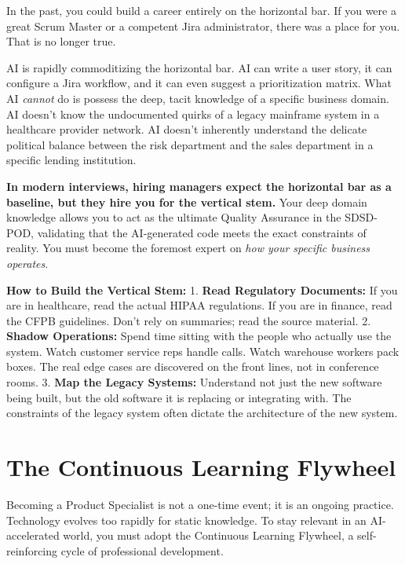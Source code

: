 In the past, you could build a career entirely on the horizontal bar. If
you were a great Scrum Master or a competent Jira administrator, there
was a place for you. That is no longer true.

AI is rapidly commoditizing the horizontal bar. AI can write a user
story, it can configure a Jira workflow, and it can even suggest a
prioritization matrix. What AI \emph{cannot} do is possess the deep,
tacit knowledge of a specific business domain. AI doesn't know the
undocumented quirks of a legacy mainframe system in a healthcare
provider network. AI doesn't inherently understand the delicate
political balance between the risk department and the sales department
in a specific lending institution.

\textbf{In modern interviews, hiring managers expect the horizontal bar
as a baseline, but they hire you for the vertical stem.} Your deep
domain knowledge allows you to act as the ultimate Quality Assurance in
the SDSD-POD, validating that the AI-generated code meets the exact
constraints of reality. You must become the foremost expert on \emph{how
your specific business operates}.

\textbf{How to Build the Vertical Stem:} 1. \textbf{Read Regulatory
Documents:} If you are in healthcare, read the actual HIPAA regulations.
If you are in finance, read the CFPB guidelines. Don't rely on
summaries; read the source material. 2. \textbf{Shadow Operations:}
Spend time sitting with the people who actually use the system. Watch
customer service reps handle calls. Watch warehouse workers pack boxes.
The real edge cases are discovered on the front lines, not in conference
rooms. 3. \textbf{Map the Legacy Systems:} Understand not just the new
software being built, but the old software it is replacing or
integrating with. The constraints of the legacy system often dictate the
architecture of the new system.

\bigskip

\section{The Continuous Learning
Flywheel}\label{the-continuous-learning-flywheel}

Becoming a Product Specialist is not a one-time event; it is an ongoing
practice. Technology evolves too rapidly for static knowledge. To stay
relevant in an AI-accelerated world, you must adopt the Continuous
Learning Flywheel, a self-reinforcing cycle of professional development.

